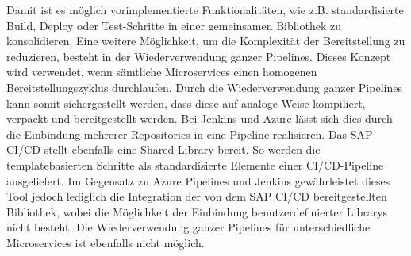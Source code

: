 \vspace*{-15mm}
 Damit ist es möglich vorimplementierte Funktionalitäten, wie z.B. standardisierte Build, Deploy oder Test-Schritte in einer gemeinsamen Bibliothek zu konsolidieren. Eine weitere Möglichkeit, um die Komplexität der Bereitstellung zu reduzieren, besteht in der Wiederverwendung ganzer Pipelines. Dieses Konzept wird verwendet, wenn sämtliche Microservices einen homogenen Bereitstellungszyklus durchlaufen. Durch die Wiederverwendung ganzer Pipelines kann somit sichergestellt werden, dass diese auf analoge Weise kompiliert, verpackt und bereitgestellt werden. Bei Jenkins und Azure lässt sich dies durch die Einbindung mehrerer Repositories in eine Pipeline realisieren. Das SAP CI/CD stellt ebenfalls eine Shared-Library bereit. So werden die templatebasierten Schritte als standardisierte Elemente einer CI/CD-Pipeline ausgeliefert. Im Gegensatz zu Azure Pipelines und Jenkins gewährleistet dieses Tool jedoch lediglich die Integration der von dem SAP CI/CD bereitgestellten Bibliothek, wobei die Möglichkeit der Einbindung benutzerdefinierter Librarys nicht besteht. Die Wiederverwendung ganzer Pipelines für unterschiedliche Microservices ist ebenfalls nicht möglich.
